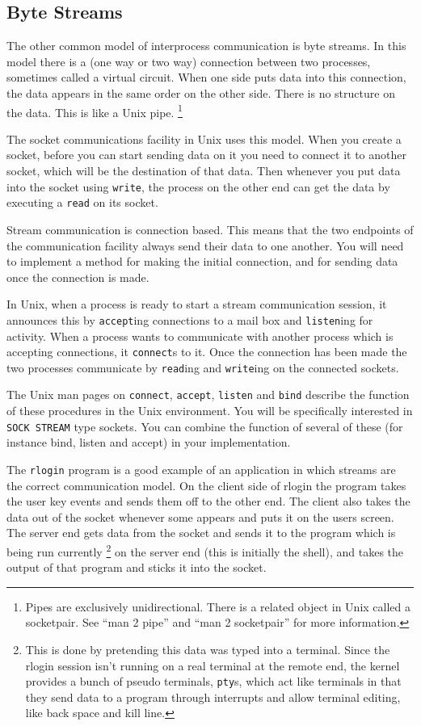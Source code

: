 \subsection{Byte Streams}

The other common model of interprocess communication is byte streams.  In
this model there is a (one way or two way) connection between two processes,
sometimes called a virtual circuit.  When one side puts data into this
connection, the data appears in the same order on the other side.  There is
no structure on the data.  This is like a Unix pipe.
\footnote{Pipes are exclusively unidirectional. There is a related
object in Unix called a socketpair.  See ``man 2 pipe'' and
``man 2 socketpair'' for more information.}

The socket communications facility in Unix uses this model.  When you create
a socket, before you can start sending data on it you need to connect it to
another socket, which will be the destination of that data.  Then whenever
you put data into the socket using {\tt write}, the process on the other
end can get the data by executing a {\tt read} on its socket.

Stream communication is connection based.  This means that the two endpoints
of the communication facility always send their data to one another.  You
will need to implement a method for making the initial connection, and for
sending data once the connection is made.

In Unix,
when a process is ready to start a stream communication session, it
announces this by {\tt accept}ing connections to a mail box
and {\tt listen}ing for activity.  When a
process wants to communicate with another process which is accepting
connections, it {\tt connect}s to it.  Once the connection has been
made the two processes communicate by {\tt read}ing and {\tt write}ing
on the connected sockets.

The Unix man pages on {\tt connect}, {\tt accept}, {\tt listen}
and {\tt bind} describe the function
of these procedures in the Unix environment.  You will be specifically
interested in {\tt SOCK STREAM} type sockets.  You can combine
the function of several of these (for instance bind, listen and accept)
in your implementation.

The {\tt rlogin} program is a good example of an application in which
streams are the correct communication model.  On the client side of
rlogin the program takes the user key events and sends them off to the
other end.  The client also takes the data out of the socket whenever
some appears and puts it on the users screen.  The server end gets data
from the socket and sends it to the program which is being run currently
\footnote{This is done by pretending this data was typed into a terminal.
Since the rlogin session isn't running on a real terminal at the remote
end, the kernel provides a bunch of pseudo terminals, {\tt pty}s, which
act like terminals in that they send data to a program through interrupts
and allow terminal editing, like back space and kill line.}
on the server end (this is initially the shell), and takes the output
of that program and sticks it into the socket.



